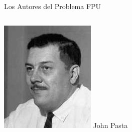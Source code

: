 \begin{frame}{Los Autores del Problema FPU}
\begin{columns}[T]
        \begin{column}{0.24\textwidth}
            \centering
            \includegraphics[width=\textwidth]{images/john_pasta.jpg}
            John Pasta
        \end{column}
        

\end{columns}
\end{frame}
